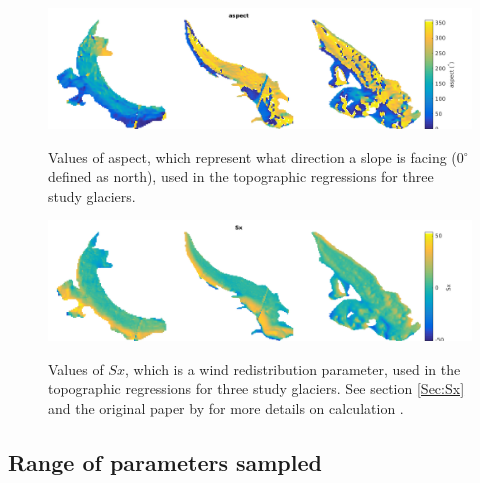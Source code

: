 \documentclass[12pt]{article}
\begin{document}
\begin{landscape}
\begin{figure}
	\centering
	\includegraphics[height = 0.4\textwidth]{Map_aspect.png}\\
	\caption{Values of aspect, which represent what direction a slope is facing (0${^\circ}$ defined as north), used in the topographic regressions for three study glaciers.}
	\label{map:aspect}
\end{figure}

\begin{figure}
	\centering
	\includegraphics[height = 0.4\textwidth]{Map_Sx.png}\\
	\caption{Values of $Sx$, which is a wind redistribution parameter, used in the topographic regressions for three study glaciers. See section \ref{Sec:Sx} and the original paper by \cite{Winstral2002} for more details on calculation .}
	\label{map:Sx}
\end{figure}

\end{landscape}

\subsection{Range of parameters sampled}
\end{document}
